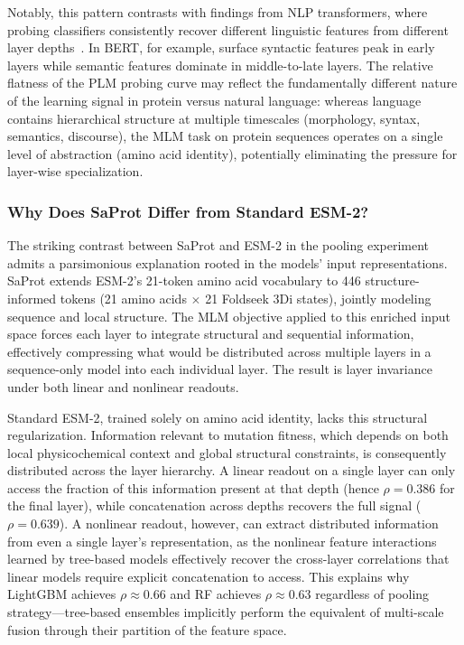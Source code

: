 \documentclass[11pt,a4paper]{article}
\begin{document}
Notably, this pattern contrasts with findings from NLP transformers, where
probing classifiers consistently recover different linguistic features from
different layer depths~\cite{tenney2019bert,rogers2021bertology}. In BERT, for example,
surface syntactic features peak in early layers while semantic features dominate
in middle-to-late layers. The relative flatness of the PLM probing curve may
reflect the fundamentally different nature of the learning signal in protein
versus natural language: whereas language contains hierarchical structure at
multiple timescales (morphology, syntax, semantics, discourse), the MLM task on
protein sequences operates on a single level of abstraction (amino acid identity),
potentially eliminating the pressure for layer-wise specialization.

\subsubsection{Why Does SaProt Differ from Standard ESM-2?}

The striking contrast between SaProt and ESM-2 in the pooling experiment admits
a parsimonious explanation rooted in the models' input representations.
SaProt extends ESM-2's 21-token amino acid vocabulary to 446 structure-informed
tokens (21 amino acids $\times$ 21 Foldseek 3Di states), jointly modeling
sequence and local structure. The MLM objective applied to this enriched input
space forces each layer to integrate structural and sequential information,
effectively compressing what would be distributed across multiple layers in
a sequence-only model into each individual layer. The result is layer invariance
under both linear and nonlinear readouts.

Standard ESM-2, trained solely on amino acid identity, lacks this structural
regularization. Information relevant to mutation fitness, which depends on
both local physicochemical context and global structural constraints, is
consequently distributed across the layer hierarchy. A linear readout on a
single layer can only access the fraction of this information present at that
depth (hence $\rho = 0.386$ for the final layer), while concatenation across
depths recovers the full signal ($\rho = 0.639$). A nonlinear readout, however,
can extract distributed information from even a single layer's representation,
as the nonlinear feature interactions learned by tree-based models effectively
recover the cross-layer correlations that linear models require explicit
concatenation to access. This explains why LightGBM achieves $\rho \approx 0.66$
and RF achieves $\rho \approx 0.63$ regardless of pooling strategy---tree-based
ensembles implicitly perform the equivalent of multi-scale fusion through their
partition of the feature space.
\end{document}
